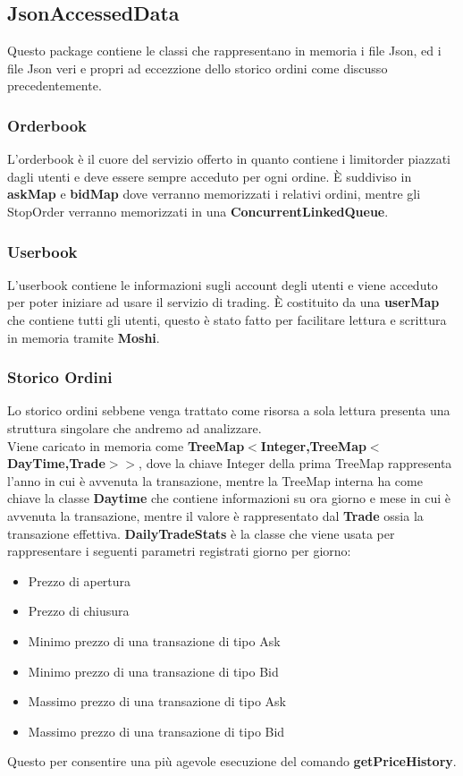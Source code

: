 \documentclass{article}
\begin{document}
\subsection{JsonAccessedData}
Questo package contiene le classi che rappresentano in memoria i file Json, ed i file Json veri e propri ad eccezzione dello storico ordini come discusso precedentemente.

\subsubsection{Orderbook}
L'orderbook è il cuore del servizio offerto in quanto contiene i limitorder piazzati dagli utenti e deve essere sempre acceduto per ogni ordine. È suddiviso in \textbf{askMap} e \textbf{bidMap} dove verranno memorizzati i relativi ordini, mentre gli StopOrder verranno memorizzati in una \textbf{ConcurrentLinkedQueue}.
\subsubsection{Userbook}
L'userbook contiene le informazioni sugli account degli utenti e viene acceduto per poter iniziare ad usare il servizio di trading. È costituito da una \textbf{userMap} che contiene tutti gli utenti, questo è stato fatto per facilitare lettura e scrittura in memoria tramite \textbf{Moshi}. 
\subsubsection{Storico Ordini}
Lo storico ordini sebbene venga trattato come risorsa a sola lettura presenta una struttura singolare che andremo ad analizzare.
\\Viene caricato in memoria come \textbf{TreeMap$<$Integer,TreeMap$<$DayTime,Trade$>$$>$}, dove la chiave Integer della prima TreeMap rappresenta l'anno in cui è avvenuta la transazione, mentre la TreeMap interna ha come chiave la classe \textbf{Daytime} che contiene informazioni su ora giorno e mese in cui è avvenuta la transazione, mentre il valore è rappresentato dal \textbf{Trade} ossia la transazione effettiva.
\textbf{DailyTradeStats} è la classe che viene usata per rappresentare i seguenti parametri registrati giorno per giorno:
\begin{itemize}
  \item Prezzo di apertura
  \item Prezzo di chiusura
  \item Minimo prezzo di una transazione di tipo Ask
  \item Minimo prezzo di una transazione di tipo Bid
  \item Massimo prezzo di una transazione di tipo Ask
  \item Massimo prezzo di una transazione di tipo Bid
\end{itemize}
Questo per consentire una più agevole esecuzione del comando \textbf{getPriceHistory}.
\end{document}
